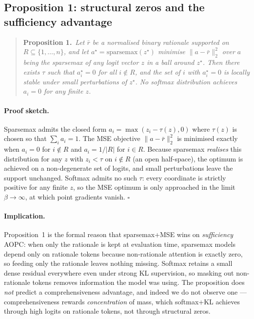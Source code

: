 \documentclass{article}
\begin{document}
\subsection{Proposition 1: structural zeros and the sufficiency advantage}
\label{sec:proposition}

\begin{quote}
\textbf{Proposition 1.}\ \emph{Let $\bar r$ be a normalised binary rationale supported on
$R \subseteq \{1,\dots,n\}$, and let $a^\star = \mathrm{sparsemax}(z^\star)$ minimise
$\|a - \bar r\|_2^2$ over $a$ being the sparsemax of any logit vector $z$ in a ball
around $z^\star$. Then there exists $\tau$ such that $a^\star_i = 0$ for all $i \notin R$,
and the set of $i$ with $a^\star_i = 0$ is locally stable under small perturbations of
$z^\star$. No softmax distribution achieves $a_i = 0$ for any finite $z$.}
\end{quote}

\paragraph{Proof sketch.}
Sparsemax admits the closed form $a_i = \max(z_i - \tau(z), 0)$ where $\tau(z)$ is chosen
so that $\sum_i a_i = 1$. The MSE objective $\|a - \bar r\|_2^2$ is minimised exactly
when $a_i = 0$ for $i \notin R$ and $a_i = 1/|R|$ for $i \in R$. Because sparsemax
\emph{realises} this distribution for any $z$ with $z_i < \tau$ on $i \notin R$ (an open
half-space), the optimum is achieved on a non-degenerate set of logits, and small
perturbations leave the support unchanged. Softmax admits no such $\tau$: every coordinate
is strictly positive for any finite $z$, so the MSE optimum is only approached in the
limit $\beta \to \infty$, at which point gradients vanish. \hfill$\square$

\paragraph{Implication.} Proposition~1 is the formal reason that sparsemax+MSE wins on
\emph{sufficiency} AOPC: when only the rationale is kept at evaluation time, sparsemax
models depend only on rationale tokens because non-rationale attention is exactly zero,
so feeding only the rationale leaves nothing missing. Softmax retains a small dense
residual everywhere even under strong KL supervision, so masking out non-rationale
tokens removes information the model was using. The proposition does \emph{not} predict a
comprehensiveness advantage, and indeed we do not observe one --- comprehensiveness
rewards \emph{concentration} of mass, which softmax+KL achieves through high logits on
rationale tokens, not through structural zeros.
\end{document}
